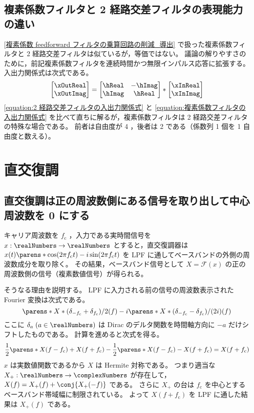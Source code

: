     \subsection{複素係数フィルタと 2 経路交差フィルタの表現能力の違い}
        \ref{複素係数 feedforward フィルタの乗算回路の削減_導出} で扱った複素係数フィルタと 2 経路交差フィルタは似ているが，等価ではない。
        議論の解りやすさのために，前記複素係数フィルタを連続時間かつ無限インパルス応答に拡張する。入出力関係式は次式である。
        \begin{equation}
            \label{equation:複素係数フィルタの入出力関係式}
            \begin{bmatrix}
                \xOutReal \\
                \xOutImag
            \end{bmatrix} = \begin{bmatrix}
                \hReal & -\hImag \\
                \hImag & \hReal
            \end{bmatrix} *
            \begin{bmatrix}
                \xInReal \\
                \xInImag
            \end{bmatrix}
        \end{equation}
        \cref{equation:2 経路交差フィルタの入出力関係式} と \cref{equation:複素係数フィルタの入出力関係式} を比べて直ちに解るが，複素係数フィルタは 2 経路交差フィルタの特殊な場合である。
        前者は自由度が 4 ，後者は 2 である（係数列 1 個を 1 自由度と数える）。
    \section{直交復調}
        \newcommand*{\fc}{f_\text{c}}
        \subsection{直交復調は正の周波数側にある信号を取り出して中心周波数を 0 にする}
            キャリア周波数を $\fc$ ，入力である実時間信号を $x:\realNumbers\to\realNumbers$ とすると，直交復調器は $x(t)\parens*{\cos(2\pi \fc t) - i\sin(2\pi \fc t)}$ を LPF に通してベースバンドの外側の周波数成分を取り除く。
            その結果，ベースバンド信号として $X = \mathcal{F}(x)$ の正の周波数側の信号（複素数値信号）が得られる。
            \par
            そうなる理由を説明する。
            LPF に入力される前の信号の周波数表示された Fourier 変換は次式である。
            \[ \parens*{X*(\delta_{-\fc} + \delta_{\fc})/2}(f) - i\parens*{X*(\delta_{-\fc} - \delta_{\fc})/(2i)}(f) \]
            ここに $\delta_a\;(a\in\realNumbers)$ は Dirac のデルタ関数を時間軸方向に $-a$ だけシフトしたものである。
            計算を進めると次式を得る。
            \[ \frac{1}{2}\parens*{X(f-\fc)+X(f+\fc)} - \frac{1}{2}\parens*{X(f-\fc)-X(f+\fc)} = X(f+\fc) \]
            $x$ は実数値関数であるから $X$ は Hermite 対称である。
            つまり適当な $X_+:\realNumbers\to\complexNumbers$ が存在して，$X(f) = X_+(f) + \conj{X_+(-f)}$ である。
            さらに $X_+$ の台は $\fc$ を中心とするベースバンド帯域幅に制限されている。
            よって $X(f+\fc)$ を LPF に通した結果は $X_+(f)$ である。

